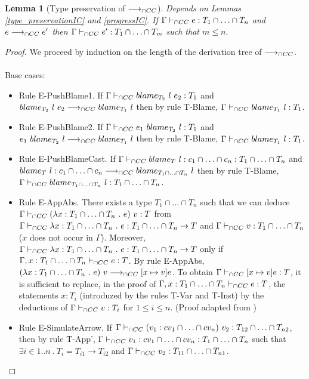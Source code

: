 \documentclass[a4paper]{article}
\newtheorem{lemma}{Lemma}[section]
\begin{document}
\begin{lemma}[Type preservation of $\longrightarrow_{\cap CC}$]
\label{type_preservation}
Depends on Lemmas \ref{type_preservationIC} and \ref{progressIC}.
If $\Gamma \vdash_{\cap CC} e : T_1 \cap \ldots \cap T_n$ and $e \longrightarrow_{\cap CC} e'$ then $\Gamma \vdash_{\cap CC} e' : T_1 \cap \ldots \cap T_m$ such that $m \leq n$.
\end{lemma}
\begin{proof}
We proceed by induction on the length of the derivation tree of $\longrightarrow_{\cap CC}$.\\\\
Base cases:
\begin{itemize}
    \item Rule E-PushBlame1.
    If $\Gamma \vdash_{\cap CC} blame_{T_2}\ l\ e_2 : T_1$ and $blame_{T_2}\ l\ e_2 \longrightarrow_{\cap CC} blame_{T_1}\ l$ then by rule T-Blame, $\Gamma \vdash_{\cap CC} blame_{T_1}\ l : T_1$.
    \item Rule E-PushBlame2.
    If $\Gamma \vdash_{\cap CC} e_1\ blame_{T_2}\ l : T_1$ and $e_1\ \blame{T_2}{l} \gios \blame{T_1}{l}$ then by rule T-Blame, $\Gamma \vdash_{\cap CC} blame_{T_1}\ l : T_1$.
    \item Rule E-PushBlameCast.
    If $\Gamma \vdash_{\cap CC} blame_{T}\ l : c_1 \cap \ldots \cap c_n : T_1 \cap \ldots \cap T_n$ and $blame_{T}\ l : c_1 \cap \ldots \cap c_n \longrightarrow_{\cap CC} blame_{T_1 \cap \ldots \cap T_n}\ l$ then by rule T-Blame, $\Gamma \vdash_{\cap CC} blame_{T_1 \cap \ldots \cap T_n}\ l : T_1 \cap \ldots \cap T_n$.
    \item Rule E-AppAbs.
    There exists a type $T_1 \cap \ldots \cap T_n$ such that we can deduce $\Gamma \vdash_{\cap CC} (\lambda x : T_1 \cap \ldots \cap T_n\ .\ e)\ v : T$ from $\Gamma \iccts \lambda x : T_1 \cap \ldots \cap T_n\ .\ e : T_1 \cap \ldots \cap T_n \rightarrow T$ and $\Gamma \vdash_{\cap CC} v : T_1 \cap \ldots \cap T_n$ ($x$ does not occur in $\Gamma$).
    Moreover, $\Gamma \iccts \lambda x : T_1 \cap \ldots \cap T_n\ .\ e : T_1 \cap \ldots \cap T_n \rightarrow T$ only if $\Gamma, x : T_1 \cap \ldots \cap T_n \vdash_{\cap CC} e : T$.
    By rule E-AppAbs, $(\lambda x : T_1 \cap \ldots \cap T_n\ .\ e)\ v \longrightarrow_{\cap CC} [x \mapsto v] e$.
    To obtain $\Gamma \vdash_{\cap CC} [x \mapsto v] e : T$, it is sufficient to replace, in the proof of $\Gamma, x : T_1 \cap \ldots \cap T_n \vdash_{\cap CC} e : T$, the statements $x : T_i$ (introduzed by the rules T-Var and T-Inst) by the deductions of $\Gamma \vdash_{\cap CC} v : T_i$ for $1 \leq i \leq n$.
    (Proof adapted from \cite{coppo1980extension})
    \item Rule E-SimulateArrow.
    If $\Gamma \vdash_{\cap CC} (v_1 : cv_1 \cap \ldots \cap cv_n)\ v_2 : T_{12} \cap \ldots \cap T_{n2}$, then by rule T-App', $\Gamma \vdash_{\cap CC} v_1 : cv_1 \cap \ldots \cap cv_n : T_1 \cap \ldots \cap T_n$ such that $\exists i \in 1 .. n\ .\ T_i = T_{i1} \rightarrow T_{i2}$ and $\Gamma \vdash_{\cap CC} v_2 : T_{11} \cap \ldots \cap T_{n1}$.

\end{itemize}
\end{proof}
\end{document}
